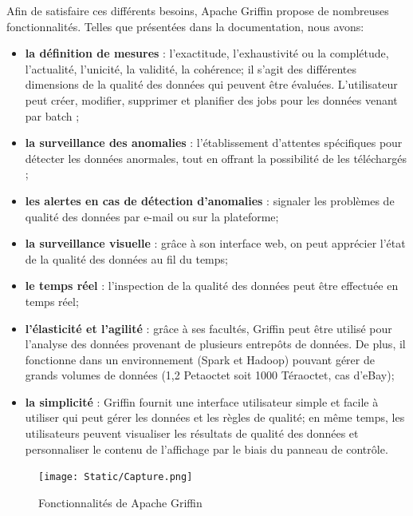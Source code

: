 Afin de satisfaire ces diff\'erents besoins, Apache Griffin propose de nombreuses fonctionnalit\'es. Telles que pr\'esent\'ees dans la documentation, nous avons: 

\begin{itemize}[parsep=0cm,itemsep=0cm]

\item \textbf{la d\'efinition de mesures} : l'exactitude, l'exhaustivité ou la compl\'etude, l'actualité, l'unicité, la validité, la cohérence; il s'agit des diff\'erentes dimensions de la qualit\'e des donn\'ees qui peuvent \^etre \'evalu\'ees. L’utilisateur peut créer, modifier, supprimer et planifier des jobs pour les données venant par batch ;

\item \textbf{la surveillance des anomalies} : l'\'etablissement d'attentes sp\'ecifiques pour détecter les données anormales, tout en offrant la possibilit\'e de les téléchargés  ;

\item \textbf{les alertes en cas de d\'etection d'anomalies} : signaler les problèmes de qualité des données par e-mail ou sur la plateforme;

\item \textbf{la surveillance visuelle} : gr\^ace \`a son interface web, on peut appr\'ecier l'\'etat de la qualité des données au fil du temps;

\item \textbf{le temps réel} : l'inspection de la qualité des données peut être effectuée en temps réel;

\item \textbf{l'\'elasticit\'e et l'agilit\'e} : gr\^ace \`a ses facult\'es, Griffin peut être utilisé pour l'analyse des données provenant de plusieurs entrepôts de données. De plus, il fonctionne dans un environnement (Spark et Hadoop) pouvant g\'erer de grands volumes de donn\'ees (1,2 Petaoctet soit 1000 T\'eraoctet, cas d'eBay);

\item \textbf{la simplicit\'e} : Griffin fournit une interface utilisateur simple et facile à utiliser qui peut gérer les données et les règles de qualité; en même temps, les utilisateurs peuvent visualiser les résultats de qualité des données et personnaliser le contenu de l'affichage par le biais du panneau de contrôle.

\end{itemize}

\begin{figure}[H]
  \caption{Fonctionnalit\'es de Apache Griffin}  \label{fig:xray}
  \begin{center}
    \texttt{[image: Static/Capture.png]} 
  \end{center}
\end{figure}

